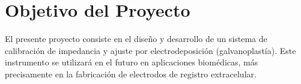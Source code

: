 \section{Objetivo del Proyecto}

El presente proyecto consiste en el diseño y desarrollo de un sistema de calibración de impedancia y ajuste por electrodeposición (galvanoplastía). Este instrumento se utilizará en el futuro en aplicaciones biomédicas, más precisamente en la fabricación de electrodos de registro extracelular.



